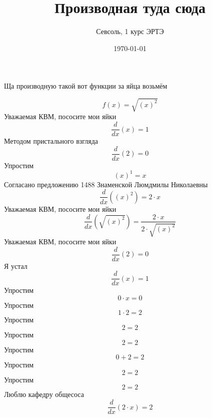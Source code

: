 \documentclass[12pt, a4paper]{article}
\begin{document}
\title{Производная туда сюда
}\author{Севсоль, 1 курс ЭРТЭ}
\date{\today}
\maketitle 
\centerline{Ща производную такой вот функции за яйца возьмём}
\begin{equation}
f(x) = \sqrt{{(x)}^{2}}
\end{equation}
Уважаемая КВМ, пососите мои яйки
\begin{equation}
\frac{d}{dx}(x) = 1
\end{equation}
Методом пристального взгляда
\begin{equation}
\frac{d}{dx}(2) = 0
\end{equation}
Упростим
\begin{equation}
{(x)}^{1} = x
\end{equation}
Согласано предложению 1488 Знаменской Люмдмилы Николаевны
\begin{equation}
\frac{d}{dx}({(x)}^{2}) = 2 \cdot x
\end{equation}
Уважаемая КВМ, пососите мои яйки
\begin{equation}
\frac{d}{dx}(\sqrt{{(x)}^{2}}) = \frac{2 \cdot x}{2 \cdot \sqrt{{(x)}^{2}}}
\end{equation}
Уважаемая КВМ, пососите мои яйки
\begin{equation}
\frac{d}{dx}(2) = 0
\end{equation}
Я устал
\begin{equation}
\frac{d}{dx}(x) = 1
\end{equation}
Упростим
\begin{equation}
0 \cdot x = 0
\end{equation}
Упростим
\begin{equation}
1 \cdot 2 = 2
\end{equation}
Упростим
\begin{equation}
2 = 2
\end{equation}
Упростим
\begin{equation}
2 = 2
\end{equation}
Упростим
\begin{equation}
0+2 = 2
\end{equation}
Упростим
\begin{equation}
2 = 2
\end{equation}
Упростим
\begin{equation}
2 = 2
\end{equation}
Люблю кафедру общесоса
\begin{equation}
\frac{d}{dx}(2 \cdot x) = 2
\end{equation}
\end{document}
